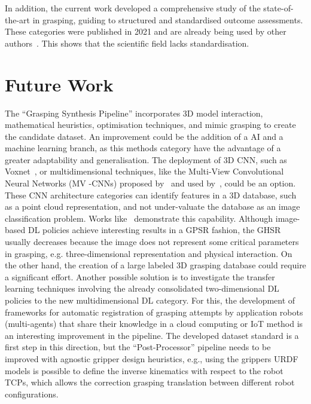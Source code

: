 In addition, the current work developed a comprehensive study of the state-of-the-art in grasping, guiding to structured and standardised outcome assessments. These categories were published in 2021 and are already being used by other authors~\cite{hu2022grasps}. This shows that the scientific field lacks standardisation.

\section{Future Work}

The ``Grasping Synthesis Pipeline'' incorporates 3D model interaction, mathematical heuristics, optimisation techniques, and mimic grasping to create the candidate dataset. An improvement could be the addition of a AI and a machine learning branch, as this methods category have the advantage of a greater adaptability and generalisation. The deployment of 3D \ac{CNN}, such as Voxnet~\cite{maturana2015voxnet}, or multidimensional techniques, like the Multi-View Convolutional Neural Networks (MV -CNNs) proposed by~\cite{su2015multi} and used by~\cite{Mahler2016}, could be an option. These CNN architecture categories can identify features in a 3D database, such as a point cloud representation, and not under-valuate the database as an image classification problem. Works like~\cite{choi2018learning} demonstrate this capability. Although image-based \ac{DL} policies achieve interesting results in a \ac{GPSR} fashion, the \ac{GHSR} usually decreases because the image does not represent some critical parameters in grasping, e.g. three-dimensional representation and physical interaction. On the other hand, the creation of a large labeled 3D grasping database could require a significant effort. Another possible solution is to investigate the transfer learning techniques involving the already consolidated two-dimensional \ac{DL} policies to the new multidimensional \ac{DL} category. For this, the development of frameworks for automatic registration of grasping attempts by application robots (multi-agents) that share their knowledge in a cloud computing or IoT method is an interesting improvement in the pipeline. The developed dataset standard is a first step in this direction, but the ``Post-Processor'' pipeline needs to be improved with agnostic gripper design heuristics, e.g., using the grippers URDF models is possible to define the inverse kinematics with respect to the robot \acp{TCP}, which allows the correction grasping translation between different robot configurations. 

